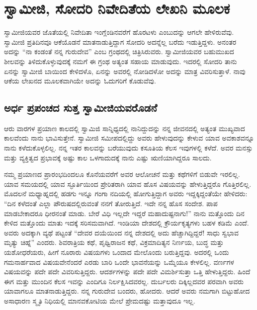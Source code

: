 
\chapter{ಸ್ವಾಮೀಜಿ, ಸೋದರಿ ನಿವೇದಿತೆಯ ಲೇಖನಿ ಮೂಲಕ}

 ಸ್ವಾಮೀಜಿಯವರ ಜೊತೆಯಲ್ಲಿ ನಿವೇದಿತಾ ಇಂಗ್ಲೆಂಡಿನವರೆಗೆ ಹೊರಟಳು ಎಂಬುದನ್ನು ಆಗಲೇ ಹೇಳಿರುವೆವು. ಸ್ವಾಮೀಜಿ ಪ್ರತಿದಿನವೂ ಆಕೆಯೊಡನೆ ಮಾತನಾಡುತ್ತಿದ್ದಾಗ ಸೋದರಿ ಅದನ್ನೆಲ್ಲ ಬರೆದು ಇಡುತ್ತಿದ್ದಳು. ಅನಂತರ ಅದನ್ನು “ನಾ ಕಂಡಂತೆ ನನ್ನ ಗುರುದೇವ” ಎಂಬ ಗ್ರಂಥದಲ್ಲಿ ಚಿತ್ರಿಸಿರುವರು. ಸ್ವಾಮೀಜಿಯವರ ಬಹುಮುಖದ ಶೀಲವನ್ನು ತಿಳಿದುಕೊಳ್ಳುವುದಕ್ಕೆ ನಮಗೆ ಈ ಗ್ರಂಥ ಅತ್ಯಂತ ಸಹಾಯ ಮಾಡುವುದು. ಇದರಲ್ಲಿ ಸೋದರಿ ತಾನು ಏನನ್ನು ಸ್ವಾಮೀಜಿ ಬಾಯಿಂದ ಕೇಳಿದಳೊ, ಏನನ್ನು ಅವರಲ್ಲಿ ನೋಡಿದಳೋ ಅದನ್ನು ಮಾತ್ರ ವಿವರಿಸುತ್ತಾಳೆ. ನಾವು ಆಕೆಯ ಲೇಖನದ ಮೂಲಕವಾಗಿಯೇ ಅದನ್ನು ಓದುಗರಿಗೆ ಕೊಡುವೆವು.

\section*{ಅರ್ಧ ಪ್ರಪಂಚದ ಸುತ್ತ ಸ್ವಾಮೀಜಿಯವರೊಡನೆ }

 ಆರು ವಾರಗಳ ಪ್ರಯಾಣ ಕಾಲದಲ್ಲಿ ಸ್ವಾಮಿಜಿ ಸಾನ್ನಿಧ್ಯದಲ್ಲಿ ನಾನಿದ್ದುದನ್ನು ನನ್ನ ಜೀವನದಲ್ಲಿ ಅತ್ಯಂತ ಮುಖ್ಯವಾದ ಕಾಲವೆಂದು ನಾನು ಭಾವಿಸುತ್ತೇನೆ. ಸ್ವಾಮೀಜಿ ಸಮೀಪದಲ್ಲಿದ್ದು ಅವರು ಹೇಳುವುದನ್ನು ಕೇಳುವ ಯಾವ ಅವಕಾಶವನ್ನೂ ನಾನು ಕಳೆದುಕೊಳ್ಳಲಿಲ್ಲ. ನನ್ನ ಇತರ ಕಾಲವನ್ನು ಬರೆಯುವುದು ಕಸೂತಿಯ ಕೆಲಸ ಇವುಗಳಲ್ಲಿ ಕಳೆದೆ. ಅವರ ಮನಸ್ಸು ಮತ್ತು ವ್ಯಕ್ತಿತ್ವದ ಪ್ರಭಾವಕ್ಕೆ ಅಷ್ಟು ಕಾಲ ಒಳಗಾದುದಕ್ಕೆ ನಾನು ಎಷ್ಟು ಋಣಿಯಾಗಿದ್ದರೂ ಸಾಲದು. 

 ನಮ್ಮ ಪ್ರಯಾಣದ ಪ್ರಾರಂಭದಿಂದಲೂ ಕೊನೆಯವರೆಗೆ ಅವರ ಆಲೋಚನೆ ಮತ್ತು ಕಥೆಗಳಿಗೆ ಬಿಡುವೇ ಇರಲಿಲ್ಲ. ಯಾವ ಸಮಯದಲ್ಲಿ ಯಾವ ಸ್ಫೂರ್ತಿಯಿಂದ ಪ್ರೇರಿತರಾಗಿ ಯಾವ ಹೊಸ ವಿಷಯವನ್ನು ಹೇಳುತ್ತಿದ್ದರೊ ಗೊತ್ತಿರಲಿಲ್ಲ. ಮೊದಲನೆ ಮಧ್ಯಾಹ್ನದಲ್ಲಿ ಹಡಗು ಇನ್ನೂ ಗಂಗಾ ನದಿಯಲ್ಲಿ ಹೋಗುತ್ತಿದ್ದಾಗ ಅವರು ಇದ್ದಕ್ಕಿದ್ದಂತೆಯೇ ಹೇಳಿದರು: “ದಿನ ಕಳೆದಂತೆ ಎಲ್ಲಾ ಪೌರುಷದಲ್ಲಿರುವಂತೆ ನನಗೆ ತೋರುತ್ತಿದೆ. ಇದೇ ನನ್ನ ಹೊಸ ಸಂದೇಶ. ಪಾಪ ಮಾಡಬೇಕಾದರೂ ಧೀರನಂತೆ ಮಾಡು. ಬೇರೆ ವಿಧಿ ಇಲ್ಲದೇ ಇದ್ದರೆ ಮಹಾದುಷ್ಟನಾಗು!” ನಾನು ಮತ್ತೊಂದು ದಿನ ಕೇಳಿದ ಮತ್ತೊಂದು ಮಾತು ಇದಕ್ಕೆ ಸರಿಸಮವಾಗಿದೆ. ಇಂಡಿಯಾ ದೇಶದಲ್ಲಿ ಕ್ರೌರ್ಯಕೃತ್ಯಗಳು ಬಹಳ ಕಡಿಮೆ ಎಂದೆ. ಅವರು ಅದಕ್ಕಾಗಿ ವ್ಯಥೆ ಪಟ್ಟಂತೆ “ದೇವರ ದಯೆಯಿಂದ ನನ್ನ ದೇಶದಲ್ಲಿ ಅದು ಹೆಚ್ಚಾಗಿದ್ದಿದ್ದರೆ! ಸಾಧು ಸ್ವಭಾವ ಮೃತ್ಯು ಚಿಹ್ನೆ” ಎಂದರು. ಶಿವರಾತ್ರಿಯ ಕಥೆ, ಪೃಥ್ವಿರಾಜನ ಕಥೆ, ವಿಕ್ರಮಾದಿತ್ಯನ ನಿರ್ಣಯ, ಬುದ್ಧ ಮತ್ತು ಯಶೋಧರೆಯರು, ಹೀಗೆ ನೂರಾರು ವಿಷಯಗಳು ಒಂದಾದ ಮೇಲೊಂದು ಬರುತ್ತಿದ್ದವು. ಅದರಲ್ಲಿ ಒಂದು ಗಮನಾರ್ಹವಾದ ವಿಷಯವೇನೆಂದರೆ ಎರಡು ಬಾರಿ ಒಂದೇ ಭಾವನೆಯನ್ನು ಒಮ್ಮೆಯೂ ಕೇಳಲಿಲ್ಲ. ವರ್ಣಗಳ ವಿಷಯವನ್ನು ಪದೇ ಪದೇ ವಿವರಿಸುತ್ತಿದ್ದರು. ಆದರ್ಶಗಳನ್ನು ಪದೇ ಪದೇ ವಿಮರ್ಶಿಸುತ್ತಾ ಒತ್ತಿ ಹೇಳುತ್ತಿದ್ದರು. ಹಿಂದೆ ಈಗ ಮತ್ತು ಮುಂದಿನ ಕೆಲಸ ಇವನ್ನು ಎಂದಿಗೂ ನಿರ್ಲಕ್ಷಿಸಿದವರಲ್ಲ. ದುರ್ಬಲರು ದಿಕ್ಕಿಲ್ಲದವರ ಪರವಾಗಿ ಅವರು ಯಾವಾಗಲೂ ಮಾತನಾಡುತ್ತಿದ್ದರು. ನನ್ನ ಗುರುದೇವ ಬಂದರು, ಹೋದರು. ಆದರೆ ಅವರು ನಮಗಾಗಿ ಬಿಟ್ಟುಹೋದ ಅಸಾಧಾರಣ ಸ್ಮೃತಿ ನಿಧಿಯಲ್ಲಿ ಮಾನವಕೋಟಿಯ ಮೇಲೆ ಪ್ರೇಮದಷ್ಟು ಮತ್ತಾವುದೂ ಇಲ್ಲ. 

